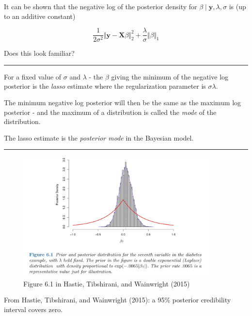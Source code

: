 \documentclass[
  letterpaper,
  DIV=11,
  numbers=noendperiod]{scrartcl}
\begin{document}
It can be shown that the negative log of the posterior density for
\(\beta \mid {\boldsymbol y}, \lambda, \sigma\) is (up to an additive
constant)

\[\frac{1}{2\sigma^2} \Vert {\boldsymbol y}-{\boldsymbol X}\beta\Vert_2^2 +\frac{\lambda}{\sigma} \Vert \beta \Vert_1\]

Does this look familiar?

\begin{center}\rule{0.5\linewidth}{0.5pt}\end{center}

For a fixed value of \(\sigma\) and \(\lambda\) - the \(\beta\) giving
the minimum of the negative log posterior is the \emph{lasso} estimate
where the regularization parameter is \(\sigma \lambda\).

The minimum negative log posterior will then be the same as the maximum
log posterior - and the maximum of a distribution is called the
\emph{mode} of the distribution.

The lasso estimate is the \emph{posterior mode} in the Bayesian model.

\begin{center}\rule{0.5\linewidth}{0.5pt}\end{center}

\begin{figure}

{\centering \includegraphics[width=0.9\textwidth,height=\textheight]{./HTWFig61.jpg}

}

\caption{Figure 6.1 in Hastie, Tibshirani, and Wainwright (2015)}

\end{figure}

From Hastie, Tibshirani, and Wainwright (2015): a 95\% posterior
credibility interval covers zero.
\end{document}
